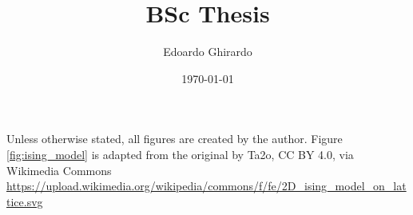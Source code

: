 \documentclass[a4paper,12pt]{report}
\title{BSc Thesis}
\author{Edoardo Ghirardo}
\date{\today}
\begin{document}

\cleardoublepage %
\null\thispagestyle{empty}
\cleardoublepage %
\null\thispagestyle{empty}




\cleardoublepage %
\null\thispagestyle{empty}


\tableofcontents









Unless otherwise stated, all figures are created by the author. Figure \ref{fig:ising_model} is adapted from the original by Ta2o, CC BY 4.0, via Wikimedia Commons \url{https://upload.wikimedia.org/wikipedia/commons/f/fe/2D_ising_model_on_lattice.svg}
\end{document}
